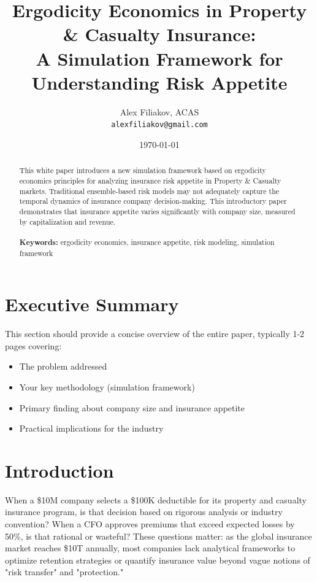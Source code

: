\documentclass[11pt,letterpaper]{article}
\title{\Large \textbf{Ergodicity Economics in Property \& Casualty Insurance: \\
A Simulation Framework for Understanding Risk Appetite}}
\author{Alex Filiakov, ACAS\\
\texttt{alexfiliakov@gmail.com}}
\date{\today}
\begin{document}
\maketitle

\begin{abstract}
This white paper introduces a new simulation framework based on ergodicity economics principles for analyzing insurance risk appetite in Property \& Casualty markets. Traditional ensemble-based risk models may not adequately capture the temporal dynamics of insurance company decision-making. This introductory paper demonstrates that insurance appetite varies significantly with company size, measured by capitalization and revenue.
\\\\
\textbf{Keywords:} ergodicity economics, insurance appetite, risk modeling, simulation framework
\end{abstract}

\newpage
\tableofcontents
\newpage

\section{Executive Summary}

This section should provide a concise overview of the entire paper, typically 1-2 pages covering:
\begin{itemize}
    \item The problem addressed
    \item Your key methodology (simulation framework)
    \item Primary finding about company size and insurance appetite
    \item Practical implications for the industry
\end{itemize}


\section{Introduction}

When a \$10M company selects a \$100K deductible for its property and casualty insurance program, is that decision based on rigorous analysis or industry convention? When a CFO approves premiums that exceed expected losses by 50\%, is that rational or wasteful? These questions matter: as the global insurance market reaches \$10T annually, most companies lack analytical frameworks to optimize retention strategies or quantify insurance value beyond vague notions of "risk transfer" and "protection."
\end{document}
